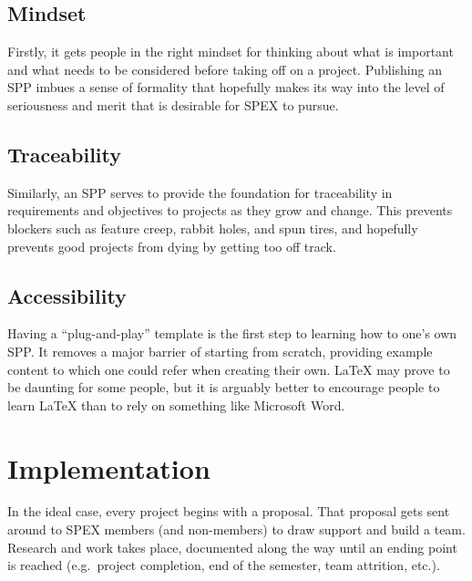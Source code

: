 \documentclass[journal]{SPEXformat}
\begin{document}
\subsection{Mindset}
\label{subsec:mindset}
Firstly, it gets people in the right mindset for thinking about what is important and what needs to be considered before taking off on a project.
Publishing an SPP imbues a sense of formality that hopefully makes its way into the level of seriousness and merit that is desirable for SPEX to pursue.

\subsection{Traceability}
\label{subsec:traceability}
Similarly, an SPP serves to provide the foundation for traceability in requirements and objectives to projects as they grow and change.
This prevents blockers such as feature creep, rabbit holes, and spun tires, and hopefully prevents good projects from dying by getting too off track.

\subsection{Accessibility}
\label{subsec:plug-n-play}
Having a ``plug-and-play'' template is the first step to learning how to one's own SPP\@.
It removes a major barrier of starting from scratch, providing example content to which one could refer when creating their own.
\LaTeX{} may prove to be daunting for some people, but it is arguably better to encourage people to learn LaTeX than to rely on something like Microsoft Word.

\section{Implementation}
\label{sec:implementation}
In the ideal case, every project begins with a proposal.
That proposal gets sent around to SPEX members (and non-members) to draw support and build a team.
Research and work takes place, documented along the way until  an ending point is reached (e.g.\ project completion, end of the semester, team attrition, etc.).
\end{document}
